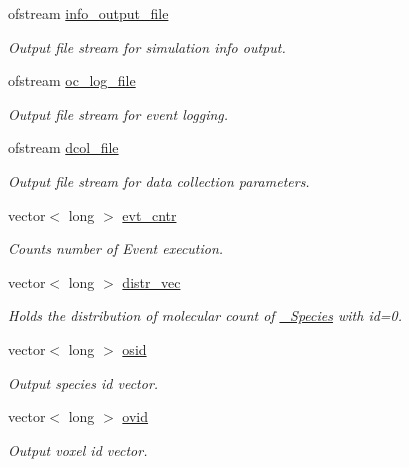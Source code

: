 \begin{DoxyCompactItemize}
ofstream \hyperlink{classnw_1_1_gillespie___sys_a1137e63fe12d34f81110bf5e8ebe856c}{info\+\_\+output\+\_\+file}
\begin{DoxyCompactList}\small\item\em Output file stream for simulation info output. \end{DoxyCompactList}\item 
ofstream \hyperlink{classnw_1_1_gillespie___sys_a4209e0d87ac2e0c5b9cad1074a900c80}{oc\+\_\+log\+\_\+file}
\begin{DoxyCompactList}\small\item\em Output file stream for event logging. \end{DoxyCompactList}\item 
ofstream \hyperlink{classnw_1_1_gillespie___sys_add6ed57b7c25852fab96b93b9acf9bff}{dcol\+\_\+file}
\begin{DoxyCompactList}\small\item\em Output file stream for data collection parameters. \end{DoxyCompactList}\item 
vector$<$ long $>$ \hyperlink{classnw_1_1_gillespie___sys_a98aa1c6ddc1cd3307882ef3bbf646e6a}{evt\+\_\+cntr}
\begin{DoxyCompactList}\small\item\em Counts number of Event execution. \end{DoxyCompactList}\item 
vector$<$ long $>$ \hyperlink{classnw_1_1_gillespie___sys_ae404ea4b9fea834a9c576778004fe0fe}{distr\+\_\+vec}
\begin{DoxyCompactList}\small\item\em Holds the distribution of molecular count of \hyperlink{classnw_1_1___species}{\+\_\+\+Species} with id=0. \end{DoxyCompactList}\item 
vector$<$ long $>$ \hyperlink{classnw_1_1_gillespie___sys_a138ba3dc15d538a31dbc7c1200bc5637}{osid}
\begin{DoxyCompactList}\small\item\em Output species id vector. \end{DoxyCompactList}\item 
vector$<$ long $>$ \hyperlink{classnw_1_1_gillespie___sys_a136eaaf0a00fc739e797f3b2bea22386}{ovid}
\begin{DoxyCompactList}\small\item\em Output voxel id vector. \end{DoxyCompactList}\item 

\end{DoxyCompactItemize}
